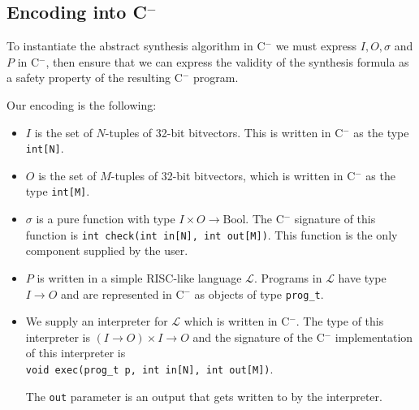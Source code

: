 \documentclass[a4paper]{llncs}
\newcommand{\newC}{C$^-$\xspace}
\begin{document}
\subsection{Encoding into \newC}
To instantiate the abstract synthesis algorithm in \newC we must express $I, O,
\sigma$ and $P$ in \newC, then ensure that we can express the validity of the
synthesis formula as a safety property of the resulting \newC program.

Our encoding is the following:
%
\begin{itemize}
 \item $I$ is the set of $N$-tuples of 32-bit bitvectors.  This is written in \newC as the type \verb|int[N]|.
 \item $O$ is the set of $M$-tuples of 32-bit bitvectors, which is written in \newC as the type \verb|int[M]|.
 \item $\sigma$ is a pure function with type $I \times O \rightarrow \mathrm{Bool}$.  The \newC signature of this function is
 \verb|int check(int in[N], int out[M])|. This function is the only component supplied
 by the user.
 \item $P$ is written in a simple RISC-like language $\mathcal{L}$.  Programs in $\mathcal{L}$
 have type $I \rightarrow O$ and
 are represented in \newC as objects of type \verb|prog_t|.
 \item We supply an interpreter for $\mathcal{L}$ which is written in \newC.  The type of
 this interpreter is $(I \rightarrow O) \times I \rightarrow O$ and the signature
 of the \newC implementation of this interpreter is \\
 \verb|void exec(prog_t p, int in[N], int out[M])|.
 
 The \verb|out| parameter is an output that gets written to by the interpreter.
\end{itemize}
\end{document}
